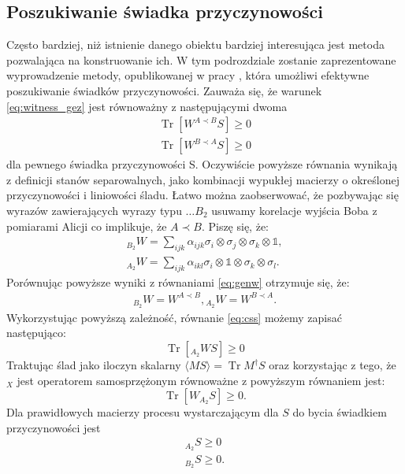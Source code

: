 \documentclass[10pt]{article} %
\DeclareMathOperator{\Trs}{Tr}
\newcommand{\I}{\mathbb{1}}
\begin{document}
\subsection{Poszukiwanie świadka przyczynowości}
Często bardziej, niż istnienie danego obiektu bardziej interesująca jest metoda pozwalająca na konstruowanie ich. W tym podrozdziale zostanie zaprezentowane wyprowadzenie metody, opublikowanej w pracy \cite{causal_witness}, która umożliwi efektywne poszukiwanie świadków przyczynowości.
Zauważa się, że warunek \eqref{eq:witness_gez} jest równoważny z następującymi dwoma
\begin{gather}
\label{eq:css2}
\Trs \left[ W^{A \prec B} S\right] \geq 0 \\
\label{eq:css}
\Trs \left[ W^{B \prec A} S\right] \geq 0
\end{gather}
dla pewnego świadka przyczynowości S.
Oczywiście powyższe równania wynikają z definicji stanów separowalnych, jako kombinacji wypukłej macierzy o określonej przyczynowości i liniowości śladu.
Łatwo można zaobserwować, że pozbywając się wyrazów zawierających wyrazy typu $\dots B_2$ usuwamy korelacje wyjścia Boba z pomiarami Alicji co
implikuje, że $A \prec B$. Piszę się, że:
\begin{gather}
{}_{B_2} W = \sum_{ijk} \alpha_{ijk} \sigma_i \otimes \sigma_j \otimes \sigma_k \otimes \I,\\
{}_{A_2} W = \sum_{ijk} \alpha_{ikl} \sigma_i \otimes \I \otimes \sigma_k \otimes \sigma_l.
\end{gather}
Porównując powyższe wyniki z równaniami \ref{eq:genw} otrzymuje się, że:
\begin{gather}
{}_{B_2} W = W^{A \prec B},
{}_{A_2} W = W^{B \prec A}.
\end{gather}
Wykorzystując powyższą zależność, równanie \eqref{eq:css} możemy zapisać następująco:
\begin{equation}
\Trs \left[ {}_{A_2} W S\right] \geq 0
\end{equation}
Traktując ślad jako iloczyn skalarny $\langle M S \rangle = \Trs M^\dag S$ oraz korzystając z tego, że ${}_X$ jest operatorem samosprzężonym równoważne z powyższym
równaniem jest:
\begin{equation}
\Trs \left[ W {}_{A_2}S \right] \geq 0.
\end{equation}
Dla prawidłowych macierzy procesu wystarczającym dla $S$ do bycia świadkiem przyczynowości jest 
\begin{gather}
{}_{A_2} S \geq 0 \\
{}_{B_2} S \geq 0.
\end{gather}
\end{document}
